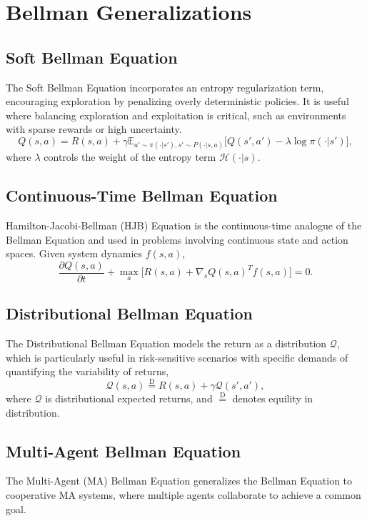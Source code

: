 \section{Bellman Generalizations}

\subsection{Soft Bellman Equation}
The Soft Bellman Equation incorporates an entropy regularization term, encouraging exploration by penalizing overly deterministic policies. It is useful where balancing exploration and exploitation is critical, such as environments with sparse rewards or high uncertainty.
\begin{equation}
Q(s, a) = R(s,a) + \gamma \mathbb{E}_{a'\sim \pi(\cdot|s'), s' \sim P(\cdot | s, a)} \Big[Q(s', a') - \lambda \log\pi(\cdot|s') \Big],
\end{equation}
where $\lambda$ controls the weight of the entropy term $\mathcal{H}(\cdot|s)$.

\subsection{Continuous-Time Bellman Equation}
Hamilton-Jacobi-Bellman (HJB) Equation is the continuous-time analogue of the Bellman Equation and used in problems involving continuous state and action spaces. Given system dynamics $f(s, a)$, 
\begin{equation}
\frac{\partial Q(s,a)}{\partial t} + \max_a \Big[ R(s,a) + \nabla_s Q(s,a)^T f(s, a) \Big]=0.
\end{equation}

\subsection{Distributional Bellman Equation}
The Distributional Bellman Equation models the return as a distribution $\mathcal{Q}$, which is particularly useful in risk-sensitive scenarios with specific demands of quantifying the variability of returns,
\begin{equation}
\mathcal{Q}(s, a) \stackrel{\text{D}}{=} R(s,a) + \gamma \mathcal{Q}(s', a'),
\end{equation}
where $\mathcal{Q}$ is distributional expected returns, and $\stackrel{\text{D}}{=}$ denotes equility in distribution.

\subsection{Multi-Agent Bellman Equation}
The Multi-Agent (MA) Bellman Equation generalizes the Bellman Equation to cooperative MA systems, where multiple agents collaborate to achieve a common goal.


